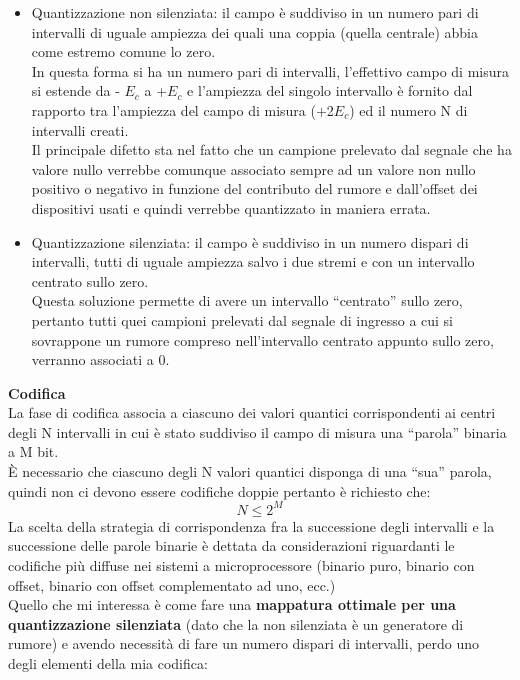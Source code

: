 \documentclass{article}
\begin{document}
\begin{itemize}
    \item Quantizzazione non silenziata: il campo è suddiviso in un numero pari di intervalli di uguale 
ampiezza dei quali una coppia (quella centrale) abbia come estremo comune lo zero.\\ In 
questa forma si ha un numero pari di intervalli, l'effettivo campo di misura si estende da - 
$E_{c}$ a +$E_{c}$ e l'ampiezza del singolo intervallo è fornito dal rapporto tra l'ampiezza del campo 
di misura (+2$E_{c}$) ed il numero N di intervalli creati. \\
Il principale difetto sta nel fatto che un campione prelevato dal segnale che ha valore nullo 
verrebbe comunque associato sempre ad un valore non nullo positivo o negativo in 
funzione del contributo del rumore e dall’offset dei dispositivi usati e quindi verrebbe quantizzato in maniera errata.
    \item Quantizzazione silenziata: il campo è suddiviso in un numero dispari di intervalli, tutti di 
uguale ampiezza salvo i due stremi e con un intervallo centrato sullo zero. \\Questa 
soluzione permette di avere un intervallo “centrato” sullo zero, pertanto tutti quei 
campioni prelevati dal segnale di ingresso a cui si sovrappone un rumore compreso 
nell'intervallo centrato appunto sullo zero, verranno associati a 0. \\
\end{itemize}
\textbf{Codifica}\\
La fase di codifica associa a ciascuno dei valori quantici corrispondenti ai centri degli N intervalli in cui è stato suddiviso il campo di misura una “parola” binaria a M bit.\\
È necessario che ciascuno degli N  valori quantici disponga di una “sua” parola, quindi non ci devono essere codifiche doppie pertanto è richiesto che:
\begin{equation}
   N\leq 2^M
\end{equation}
La scelta della strategia di corrispondenza fra la successione degli intervalli e la successione delle parole binarie è dettata da considerazioni riguardanti le codifiche più diffuse nei sistemi a microprocessore (binario puro, binario con offset, binario con offset complementato ad uno, ecc.)\\
Quello che mi interessa è come fare una \textbf{mappatura ottimale per una quantizzazione silenziata} (dato che la non silenziata è un generatore di rumore) e  avendo necessità di fare un numero dispari di intervalli, perdo uno degli elementi della mia codifica:
\end{document}
